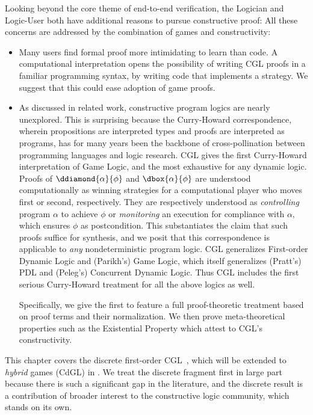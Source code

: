 \documentclass[12pt]{cmuthesis}
\theoremstyle{definition}
\theoremstyle{remark}
\newcommand{\rref}[2][]{\prettyref{#2}}
\newcommand{\CGL}{\textsf{CGL}\xspace}
\newcommand{\CdGL}{\textsf{CdGL}\xspace}
\begin{document}
Looking beyond the core theme of end-to-end verification, the Logician and Logic-User both have additional reasons to pursue constructive proof:
All these concerns are addressed by the combination of games and constructivity:
\begin{itemize}
\item
Many users find formal proof more intimidating to learn than code.
A computational interpretation opens the possibility of writing \CGL proofs in a familiar programming syntax, by writing code that implements a strategy.
We suggest that this could ease adoption of game proofs.
\item
As discussed in related work, constructive program logics are nearly unexplored.
This is surprising because the Curry-Howard correspondence, wherein propositions are interpreted types and proofs are interpreted as programs, has for many years been the backbone of cross-pollination between programming languages and logic research.
\CGL gives the first Curry-Howard interpretation of Game Logic, and the most exhaustive for any dynamic logic.
Proofs of $\ddiamond{\alpha}{\phi}$ and $\dbox{\alpha}{\phi}$ are understood computationally as winning strategies for a computational player who moves first or second, respectively.
They are respectively understood as \emph{controlling} program $\alpha$ to achieve $\phi$ or \emph{monitoring} an execution for compliance with $\alpha,$ which ensures $\phi$ as postcondition.
This substantiates the claim that such proofs suffice for synthesis, and we posit that this correspondence is applicable to \emph{any} nondeterministic program logic.
\CGL generalizes  First-order Dynamic Logic and (Parikh's) Game Logic, which itself generalizes (Pratt's) PDL and (Peleg's) Concurrent Dynamic Logic.
Thus \CGL includes the first serious Curry-Howard treatment for all the above logics as well.

Specifically, we give the first to feature a full proof-theoretic treatment based on proof terms and their normalization.
We then prove meta-theoretical properties such as the Existential Property which attest to \CGL's constructivity.
\end{itemize}

This chapter covers the discrete first-order \CGL~\cite{poplcgl}, which will be extended to \emph{hybrid} games (\CdGL) in \rref{ch:cdgl}.
We treat the discrete fragment first in large part because there is such a significant gap in the literature, and the discrete result is a contribution of broader interest to the constructive logic community, which stands on its own.
\end{document}
